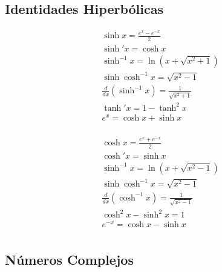\subsection{Identidades Hiperbólicas}

\begin{minipage}{0.55\textwidth}
\begin{equation}
\begin{split}
    &\sinh{x}=\frac{e^x-e^{-x}}{2}\\
    &\sinh'{x}=\cosh{x}\\
    &\sinh^{-1}{x}=\ln{(x+\sqrt{x^2+1})}\\
    &\sinh{\cosh^{-1}{x}}=\sqrt{x^2-1}\\
    &\frac{d}{dx}(\sinh^{-1}{x})=\frac{1}{\sqrt{x^2+1}}\\
    &\tanh'{x}=1-\tanh^2{x}\\
    &e^x=\cosh{x}+\sinh{x}\\
\end{split}
\nonumber
\end{equation}
\end{minipage}
\begin{minipage}{0.55\textwidth}
\begin{equation}
\begin{split}
    &\cosh{x}=\frac{e^x+e^{-x}}{2}\\
    &\cosh'{x}=\sinh{x}\\
    &\sinh^{-1}{x}=\ln{(x+\sqrt{x^2-1})}\\
    &\sinh{\cosh^{-1}{x}}=\sqrt{x^2-1}\\
    &\frac{d}{dx}(\cosh^{-1}{x})=\frac{1}{\sqrt{x^2-1}}\\
    &\cosh^2{x}-\sinh^2{x}=1\\
    &e^{-x}=\cosh{x}-\sinh{x}\\
\end{split}
\nonumber
\end{equation}
\end{minipage}

\subsection{Números Complejos}


